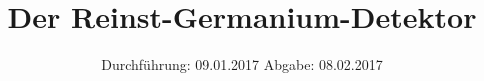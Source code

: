 

\subject{Versuch Nr. 18}
\title{Der Reinst-Germanium-Detektor}
\date{
  Durchführung: 09.01.2017
  \hspace{3em}
  Abgabe: 08.02.2017
}



\listoftodos

\maketitle
\thispagestyle{empty}
\tableofcontents
\newpage






\printbibliography


